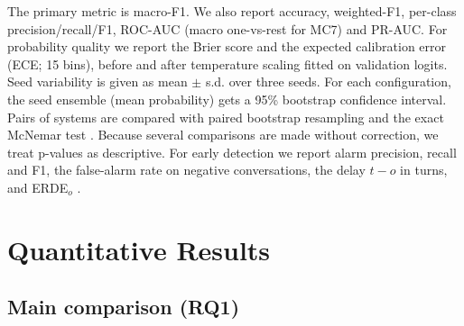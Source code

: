 \documentclass[10pt,twocolumn]{article}
\begin{document}
The primary metric is macro-F1. We also report accuracy, weighted-F1, per-class precision/recall/F1, ROC-AUC (macro
one-vs-rest for MC7) and PR-AUC. For probability quality we report the Brier score and the expected calibration error
(ECE; 15 bins), before and after temperature scaling \cite{guo2017calibration} fitted on validation logits. Seed
variability is given as mean $\pm$ s.d. over three seeds. For each configuration, the seed ensemble (mean probability) gets a
95\% bootstrap confidence interval. Pairs of systems are compared with paired bootstrap resampling \cite{koehn2004significance}
and the exact McNemar test \cite{dietterich1998tests}. Because several comparisons are made without correction, we
treat p-values as descriptive. For early detection we report alarm precision, recall and F1, the false-alarm rate on
negative conversations, the delay $\hat t-o$ in turns, and ERDE$_o$ \cite{losada2016erisk}.


\section{Quantitative Results}

\subsection{Main comparison (RQ1)}
\end{document}
